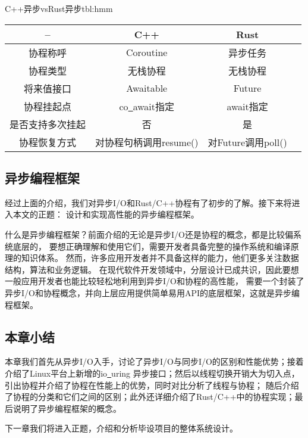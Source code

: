 \documentclass[supercite]{HustGraduPaper}
\theoremstyle{definition}
\begin{document}
\begin{generaltab}{C++异步vsRust异步}{tbl:hmm}
  \begin{tabular}{c|ccc}
    \toprule
    -- & C++ & Rust \\
    \midrule
    协程称呼 & Coroutine & 异步任务 \\
    协程类型 & 无栈协程 & 无栈协程 \\
    将来值接口 & Awaitable & Future \\
    协程挂起点 & co\underline{~}await指定 & await指定 \\
    是否支持多次挂起 & 否 & 是 \\
    协程恢复方式 & 对协程句柄调用resume() & 对Future调用poll() \\
    \bottomrule
  \end{tabular}
\end{generaltab}

\subsection{异步编程框架}

经过上面的介绍，我们对异步I/O和Rust/C++协程有了初步的了解。接下来将进入本文的正题：
设计和实现高性能的异步编程框架。\par

什么是异步编程框架？前面介绍的无论是异步I/O还是协程的概念，都是比较偏系统底层的，
要想正确理解和使用它们，需要开发者具备完整的操作系统和编译原理的知识体系。
然而，许多应用开发者并不具备这样的能力，他们更多关注数据结构，算法和业务逻辑。
在现代软件开发领域中，分层设计已成共识，因此要想一般应用开发者也能比较轻松地利用到异步I/O和协程的高性能，
需要一个封装了异步I/O和协程概念，并向上层应用提供简单易用API的底层框架，这就是异步编程框架。\par

\subsection{本章小结}

本章我们首先从异步I/O入手，讨论了异步I/O与同步I/O的区别和性能优势；接着介绍了Linux平台上新增的io\underline{~}uring
异步接口；然后以线程切换开销大为切入点，引出协程并介绍了协程在性能上的优势，同时对比分析了线程与协程；
随后介绍了协程的分类和它们之间的区别；此外还详细介绍了Rust/C++中的协程实现；最后说明了异步编程框架的概念。\par

下一章我们将进入正题，介绍和分析毕设项目的整体系统设计。\par
\end{document}
